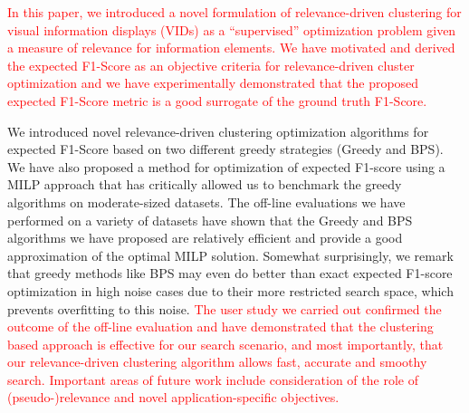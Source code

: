 



\textcolor{red}{In this paper, we introduced a novel formulation of relevance-driven clustering for visual information displays (VIDs) as a ``supervised'' optimization problem given a measure of relevance for information elements.  We have motivated and derived the expected F1-Score as an objective criteria for relevance-driven cluster optimization and we have experimentally demonstrated that the proposed expected F1-Score metric is a good surrogate of the ground truth F1-Score.}

We introduced novel relevance-driven clustering optimization algorithms for expected F1-Score based on two different greedy strategies (Greedy and BPS).  We have also proposed a method for optimization of expected F1-score using a MILP approach that has critically allowed us to benchmark the greedy algorithms on moderate-sized datasets. The off-line evaluations we have performed on a variety of datasets have shown that the Greedy and BPS algorithms we have proposed are relatively efficient and provide a good approximation of the optimal MILP solution.  Somewhat surprisingly, we remark that greedy methods like BPS may even do better than exact expected F1-score optimization in high noise cases due to their more restricted search space, which prevents overfitting to this noise. 
\textcolor{red}{The user study we carried out confirmed the outcome of the off-line evaluation and have demonstrated that the clustering based approach is effective for our search scenario, and most importantly, that our relevance-driven clustering algorithm allows fast, accurate and smoothy search. 
Important areas of future work include consideration of the role of (pseudo-)relevance and novel application-specific objectives.}



